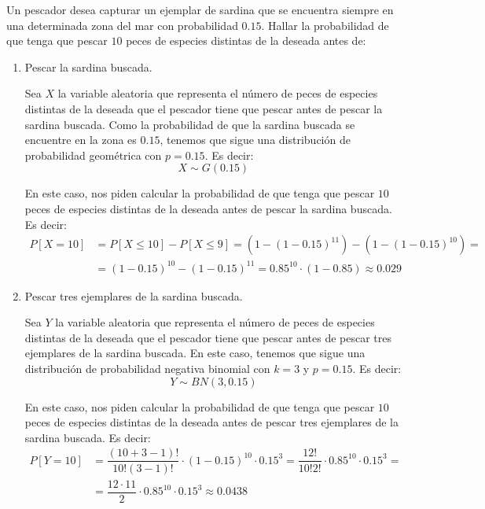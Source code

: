 \begin{ejercicio}
    Un pescador desea capturar un ejemplar de sardina que se encuentra siempre en una determinada
    zona del mar con probabilidad $0.15$. Hallar la probabilidad de que tenga que pescar $10$ peces de
    especies distintas de la deseada antes de:
    \begin{enumerate}
        \item Pescar la sardina buscada.
        
        Sea $X$ la variable aleatoria que representa el número de peces de especies distintas de la deseada que el pescador tiene que pescar antes de pescar la sardina buscada. Como la probabilidad de que la sardina buscada se encuentre en la zona es $0.15$, tenemos que sigue una distribución de probabilidad geométrica con $p=0.15$. Es decir:
        \begin{equation*}
            X \sim G(0.15)
        \end{equation*}

        En este caso, nos piden calcular la probabilidad de que tenga que pescar $10$ peces de especies distintas de la deseada antes de pescar la sardina buscada. Es decir:
        \begin{align*}
            P[X=10] &= P[X\leq 10] - P[X\leq 9] = (1-(1-0.15)^{11}) - (1-(1-0.15)^{10}) =\\
            &= (1-0.15)^{10} - (1-0.15)^{11} = 0.85^{10}\cdot (1-0.85) \approx 0.029
        \end{align*}
        
        \item Pescar tres ejemplares de la sardina buscada.
        
        Sea $Y$ la variable aleatoria que representa el número de peces de especies distintas de la deseada que el pescador tiene que pescar antes de pescar tres ejemplares de la sardina buscada. En este caso, tenemos que sigue una distribución de probabilidad negativa binomial con $k=3$ y $p=0.15$. Es decir:
        \begin{equation*}
            Y \sim BN(3,0.15)
        \end{equation*}

        En este caso, nos piden calcular la probabilidad de que tenga que pescar $10$ peces de especies distintas de la deseada antes de pescar tres ejemplares de la sardina buscada. Es decir:
        \begin{align*}
            P[Y=10] &= \dfrac{(10+3-1)!}{10!(3-1)!} \cdot (1-0.15)^{10} \cdot 0.15^3 = \dfrac{12!}{10!2!} \cdot 0.85^{10} \cdot 0.15^3 =\\
            &= \dfrac{12\cdot 11}{2} \cdot 0.85^{10} \cdot 0.15^3 \approx 0.0438
        \end{align*}
    \end{enumerate}
\end{ejercicio}

